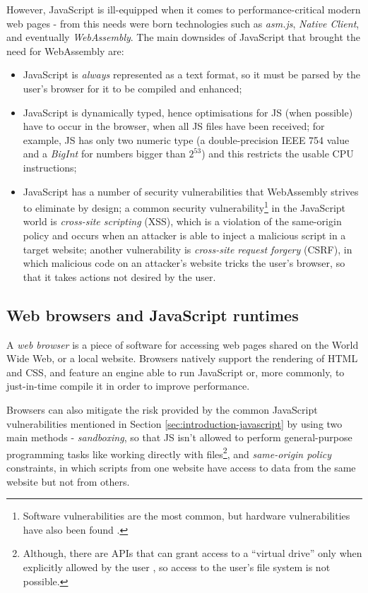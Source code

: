 However, JavaScript is ill-equipped when it comes to performance-critical modern web
pages - from this needs were born technologies such as \textit{asm.js}, \textit{Native Client}, and eventually \textit{WebAssembly}.
The main downsides of JavaScript that brought the need for WebAssembly are:
\begin{itemize}
  \item JavaScript is \textit{always} represented as a text format, so it must be parsed by the user's browser for it to be compiled and enhanced;
  \item JavaScript is dynamically typed, hence optimisations for JS (when possible) have to occur
        in the browser, when all JS files have been received;
        for example, JS has only two numeric type (a double-precision IEEE 754 value and a \textit{BigInt}
        for numbers bigger than $2^53$) and this restricts the usable CPU instructions;
  \item JavaScript has a number of security vulnerabilities that WebAssembly strives to eliminate by design;
        a common security vulnerability\footnote{Software vulnerabilities are the most common, but hardware vulnerabilities have also been found \cite{spectre}.}
        in the JavaScript world is \textit{cross-site scripting} (XSS), which is a violation of the
        same-origin policy and occurs when an attacker is able to inject a malicious script in a target website;
        another vulnerability is \textit{cross-site request forgery} (CSRF), in which malicious code on an attacker's website
        tricks the user's browser, so that it takes actions not desired by the user.
\end{itemize}

\subsection{Web browsers and JavaScript runtimes}

A \textit{web browser} is a piece of software for accessing web pages shared on the World Wide Web, or a
local website. Browsers natively support the rendering of HTML and CSS, and feature an engine able to run JavaScript or, more commonly,
to just-in-time compile it in order to improve performance.

Browsers can also mitigate the risk provided by the common JavaScript vulnerabilities mentioned in Section \ref{sec:introduction-javascript}
by using two main methods - \textit{sandboxing}, so that JS isn't allowed to perform general-purpose
programming tasks like working directly with files\footnote{Although, there are APIs that can grant access to a ``virtual drive''
only when explicitly allowed by the user \cite{filesystem-mdn}, so access to the user's file system is not possible.},
and \textit{same-origin policy} constraints, in which scripts from one website have access to data from the same website but not from others.

